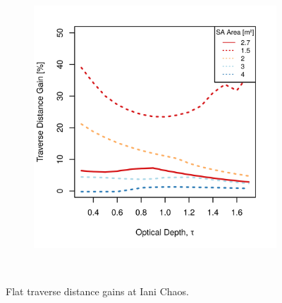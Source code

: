 \begin{figure}[h]
\begin{subfigure}[t]{\subfigureWidth}
        \includegraphics[height=\graphicsHeight]{sections/design/solar-array/plots/ianichaos-75w-traverse-gains-for-different-sa-areas.png}
		\label{fig:plot:sub:iani-chaos-flat-traverse-gains-for-different-sa-area}
	\end{subfigure}\\[0.8ex]
    \caption[Flat traverse distance gains at Iani Chaos]
            {Flat traverse distance gains at Iani Chaos.}
    \label{fig:plot:iani-chaos-flat-traverse-gains}
\vspace{-2ex}
\end{figure}




